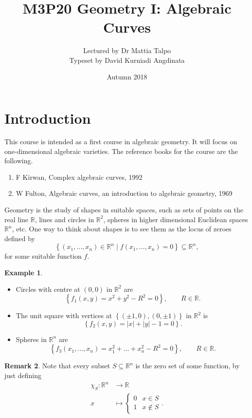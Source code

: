 \documentclass{article}
\title{M3P20 Geometry I: Algebraic Curves}
\author{Lectured by Dr Mattia Talpo \\ Typeset by David Kurniadi Angdinata}
\date{Autumn 2018}
\newcommand{\R}{\mathbb{R}}
\newcommand{\rb}[1]{\left( #1 \right)}
\newcommand{\cb}[1]{\left\{ #1 \right\}}
\newcommand{\abs}[1]{\left\lvert #1 \right\rvert}
\theoremstyle{definition}\newtheorem{definition}{Definition}[section]
\theoremstyle{definition}\newtheorem{notation}[definition]{Notation}
\theoremstyle{definition}\newtheorem{remark}[definition]{Remark}
\theoremstyle{definition}\newtheorem{example1}[definition]{Example}
\theoremstyle{definition}\newtheorem{fact}{Fact}
\theoremstyle{definition}\newtheorem{exercise}{Exercise}
\theoremstyle{definition}\newtheorem*{example2}{Example}
\begin{document}
\maketitle

\vfill

\tableofcontents

\pagebreak

\section{Introduction}


This course is intended as a first course in algebraic geometry. It will focus on one-dimensional algebraic varieties. The reference books for the course are the following.
\begin{enumerate}
\item F Kirwan, Complex algebraic curves, 1992
\item W Fulton, Algebraic curves, an introduction to algebraic geometry, 1969
\end{enumerate}

Geometry is the study of shapes in suitable spaces, such as sets of points on the real line $ \R $, lines and circles in $ \R^2 $, spheres in higher dimensional Euclidean spaces $ \R^n $, etc. One way to think about shapes is to see them as the locus of zeroes defined by
$$ \cb{\rb{x_1, \dots, x_n} \in \R^n \mid f\rb{x_1, \dots, x_n} = 0} \subseteq \R^n, $$
for some suitable function $ f $.

\begin{example1}
\label{eg:1.1}
\hfill
\begin{itemize}
\item Circles with centre at $ \rb{0, 0} $ in $ \R^2 $ are
$$ \cb{f_1\rb{x, y} = x^2 + y^2 - R^2 = 0}, \qquad R \in \R. $$
\item The unit square with vertices at $ \cb{\rb{\pm 1, 0}, \rb{0, \pm 1}} $ in $ \R^2 $ is
$$ \cb{f_2\rb{x, y} = \abs{x} + \abs{y} - 1 = 0}. $$
\item Spheres in $ \R^n $ are
$$ \cb{f_3\rb{x_1, \dots, x_n} = x_1^2 + \dots + x_n^2 - R^2 = 0}, \qquad R \in \R. $$
\end{itemize}
\end{example1}

\begin{remark}
Note that every subset $ S \subseteq \R^n $ is the zero set of some function, by just defining
\begin{align*}
\chi_S : \R^n & \to \R \\
x & \mapsto \begin{cases}
0 & x \in S \\
1 & x \notin S
\end{cases}.
\end{align*}
\end{remark}
\end{document}
